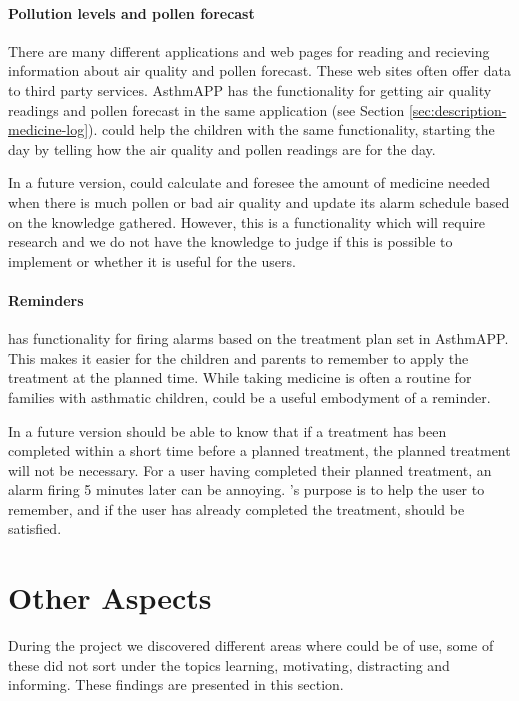 \paragraph{Pollution levels and pollen forecast}
There are many different applications and web pages for reading and recieving information about air quality and pollen forecast. These web sites often offer data to third party services. AsthmAPP has the functionality for getting air quality readings and pollen forecast in the same application (see Section \ref{sec:description-medicine-log}).
\buddy{} could help the children with the same functionality, starting the day by telling how the air quality and pollen readings are for the day. 

In a future version, \buddy{} could calculate and foresee the amount of medicine needed when there is much pollen or bad air quality and update its alarm schedule based on the knowledge gathered. However, this is a functionality which will require research and we do not have the knowledge to judge if this is possible to implement or whether it is useful for the users. 


\paragraph{Reminders}
\buddy{} has functionality for firing alarms based on the treatment plan set in AsthmAPP. This makes it easier for the children and parents to remember to apply the treatment at the planned time. While taking medicine is often a routine for families with asthmatic children, \buddy{} could be a useful embodyment of a reminder. 

In a future version \buddy{} should be able to know that if a treatment has been completed within a short time before a planned treatment, the planned treatment will not be necessary. For a user having completed their planned treatment, an alarm firing 5 minutes later can be annoying. \buddy{}'s purpose is to help the user to remember, and if the user has already completed the treatment, \ab{} should be satisfied. 

\section{Other Aspects}
\label{sec:otheraspects}
During the project we discovered different areas where \ab{} could be of use, some of these did not sort under the topics learning, motivating, distracting and informing. These findings are presented in this section.

